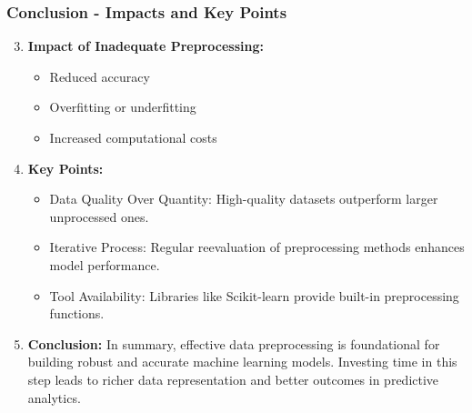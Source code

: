 \documentclass[aspectratio=169]{beamer}
\begin{document}
\begin{frame}[fragile]
    \frametitle{Conclusion - Impacts and Key Points}
    \begin{enumerate}
        \setcounter{enumi}{2}
        \item \textbf{Impact of Inadequate Preprocessing:}
        \begin{itemize}
            \item Reduced accuracy
            \item Overfitting or underfitting
            \item Increased computational costs
        \end{itemize}
        
        \item \textbf{Key Points:}
        \begin{itemize}
            \item Data Quality Over Quantity: High-quality datasets outperform larger unprocessed ones.
            \item Iterative Process: Regular reevaluation of preprocessing methods enhances model performance.
            \item Tool Availability: Libraries like Scikit-learn provide built-in preprocessing functions.
        \end{itemize}
        
        \item \textbf{Conclusion:}
        In summary, effective data preprocessing is foundational for building robust and accurate machine learning models. Investing time in this step leads to richer data representation and better outcomes in predictive analytics.
    \end{enumerate}
\end{frame}
\end{document}
